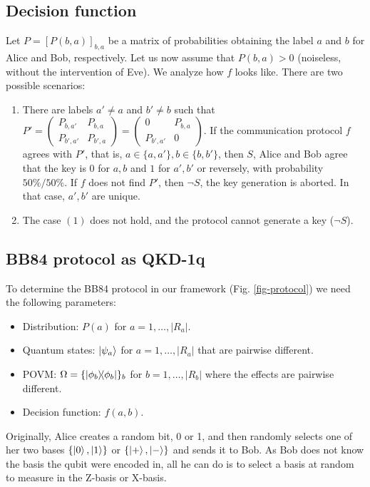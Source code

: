 \documentclass[a4paper,twocolumn,11pt,unpublished]{quantumarticle}
\newcommand{\proj}[1]{\ensuremath{\ketbra{#1}{#1}}}
\begin{document}
\subsection{Decision function}
Let $P = [P(b,a)]_{b,a}$ be a matrix of probabilities obtaining the label $a$
and $b$ for  Alice and Bob, respectively. Let us now assume that $P(b,a) > 0$
(noiseless, without the intervention of Eve). We analyze how $f$ looks like.
There are two possible scenarios:
\begin{enumerate}
    \item There are labels $a' \neq a$ and $b' \neq b$ such that $P' =
\begin{pmatrix} P_{b,a'} & P_{b,a} \\
    P_{b',a'} & P_{b',a} \end{pmatrix}= \begin{pmatrix} 0 & P_{b,a} \\
    P_{b',a'} & 0 \end{pmatrix}$. If the communication protocol $f$ agrees with
$P'$, that is, $a \in \{a,a'\}, b \in \{b,b'\}$, then $S$, Alice and Bob agree
that the key is $0$ for $a,b$ and $1$ for $a',b'$ or reversely, with probability
$50\%/50\%$. If $f$ does not find $P'$, then $\neg S$, the key generation is
aborted. In that case, $a',b'$ are unique.
    \item The case $(1)$ does not hold, and the protocol cannot generate a key
    (\(\neg S\)).
\end{enumerate}

\subsection{BB84 protocol as QKD-1q}
To determine the BB84 protocol in our framework (Fig. \ref{fig-protocol}) we
need the following parameters: 
\begin{itemize}
    \item Distribution: $P(a)$ for $a=1,\ldots,|R_a|$. 
    \item Quantum states: $ \ket{\psi_a}$ for $a=1,\ldots,|R_a|$ that are
    pairwise different.
    \item POVM: $\Omega = \{\proj{\phi_b}\}_b$ for $b=1,\ldots,|R_b|$ where the
effects are pairwise different.
    \item Decision function: $f(a, b)$.
\end{itemize} 

Originally, Alice creates a random bit, 0 or 1, and then randomly selects one of
her two bases $\{ \ket{0}, \ket{1}\}$ or $\{\ket{+}, \ket{-}\} $ and sends it to
Bob. As Bob does not know the basis the qubit were encoded in,  all he can do is
to select a basis at random to measure in the Z-basis or X-basis. 
\end{document}

